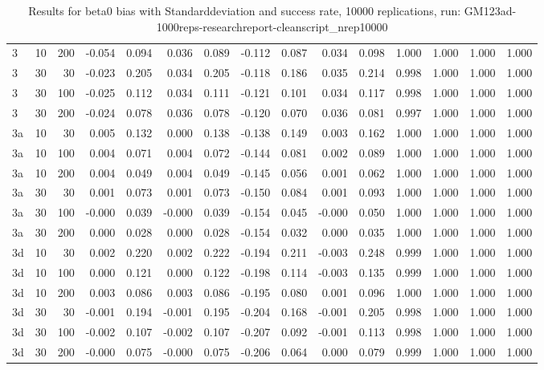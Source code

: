 \begin{table}[ht]
\begin{tabular}{lrrrrrrrrrrrrrr}
  3 & 10 & 200 & -0.054 & 0.094 & 0.036 & 0.089 & -0.112 & 0.087 & 0.034 & 0.098 & 1.000 & 1.000 & 1.000 & 1.000 \\ 
  3 & 30 & 30 & -0.023 & 0.205 & 0.034 & 0.205 & -0.118 & 0.186 & 0.035 & 0.214 & 0.998 & 1.000 & 1.000 & 1.000 \\ 
  3 & 30 & 100 & -0.025 & 0.112 & 0.034 & 0.111 & -0.121 & 0.101 & 0.034 & 0.117 & 0.998 & 1.000 & 1.000 & 1.000 \\ 
  3 & 30 & 200 & -0.024 & 0.078 & 0.036 & 0.078 & -0.120 & 0.070 & 0.036 & 0.081 & 0.997 & 1.000 & 1.000 & 1.000 \\ 
  3a & 10 & 30 & 0.005 & 0.132 & 0.000 & 0.138 & -0.138 & 0.149 & 0.003 & 0.162 & 1.000 & 1.000 & 1.000 & 1.000 \\ 
  3a & 10 & 100 & 0.004 & 0.071 & 0.004 & 0.072 & -0.144 & 0.081 & 0.002 & 0.089 & 1.000 & 1.000 & 1.000 & 1.000 \\ 
  3a & 10 & 200 & 0.004 & 0.049 & 0.004 & 0.049 & -0.145 & 0.056 & 0.001 & 0.062 & 1.000 & 1.000 & 1.000 & 1.000 \\ 
  3a & 30 & 30 & 0.001 & 0.073 & 0.001 & 0.073 & -0.150 & 0.084 & 0.001 & 0.093 & 1.000 & 1.000 & 1.000 & 1.000 \\ 
  3a & 30 & 100 & -0.000 & 0.039 & -0.000 & 0.039 & -0.154 & 0.045 & -0.000 & 0.050 & 1.000 & 1.000 & 1.000 & 1.000 \\ 
  3a & 30 & 200 & 0.000 & 0.028 & 0.000 & 0.028 & -0.154 & 0.032 & 0.000 & 0.035 & 1.000 & 1.000 & 1.000 & 1.000 \\ 
  3d & 10 & 30 & 0.002 & 0.220 & 0.002 & 0.222 & -0.194 & 0.211 & -0.003 & 0.248 & 0.999 & 1.000 & 1.000 & 1.000 \\ 
  3d & 10 & 100 & 0.000 & 0.121 & 0.000 & 0.122 & -0.198 & 0.114 & -0.003 & 0.135 & 0.999 & 1.000 & 1.000 & 1.000 \\ 
  3d & 10 & 200 & 0.003 & 0.086 & 0.003 & 0.086 & -0.195 & 0.080 & 0.001 & 0.096 & 1.000 & 1.000 & 1.000 & 1.000 \\ 
  3d & 30 & 30 & -0.001 & 0.194 & -0.001 & 0.195 & -0.204 & 0.168 & -0.001 & 0.205 & 0.998 & 1.000 & 1.000 & 1.000 \\ 
  3d & 30 & 100 & -0.002 & 0.107 & -0.002 & 0.107 & -0.207 & 0.092 & -0.001 & 0.113 & 0.998 & 1.000 & 1.000 & 1.000 \\ 
  3d & 30 & 200 & -0.000 & 0.075 & -0.000 & 0.075 & -0.206 & 0.064 & 0.000 & 0.079 & 0.999 & 1.000 & 1.000 & 1.000 \\ 
   \hline
\end{tabular}
\caption{Results for beta0 bias with Standarddeviation and success rate, 10000 replications, run: GM123ad-1000reps-researchreport-cleanscript_nrep10000} 
\label{tab:beta0_bias_sd_success}
\end{table}
